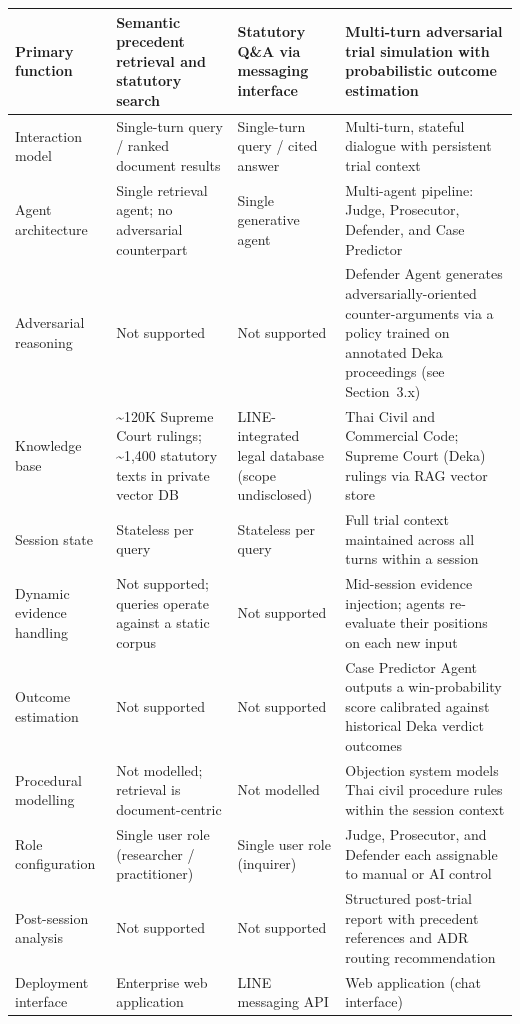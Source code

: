 \begin{longtable}{|p{3.2cm}|p{3.8cm}|p{3.8cm}|p{4.2cm}|}
Primary function & Semantic precedent retrieval and statutory search & Statutory Q\&A via messaging interface & Multi-turn adversarial trial simulation with probabilistic outcome estimation \\ \hline
Interaction model & Single-turn query / ranked document results & Single-turn query / cited answer & Multi-turn, stateful dialogue with persistent trial context \\ \hline
Agent architecture & Single retrieval agent; no adversarial counterpart & Single generative agent & Multi-agent pipeline: Judge, Prosecutor, Defender, and Case Predictor \\ \hline
Adversarial reasoning & Not supported & Not supported & Defender Agent generates adversarially-oriented counter-arguments via a policy trained on annotated Deka proceedings (see Section~3.x) \\ \hline
Knowledge base & \textasciitilde{}120K Supreme Court rulings; \textasciitilde{}1,400 statutory texts in private vector DB & LINE-integrated legal database (scope undisclosed) & Thai Civil and Commercial Code; Supreme Court (Deka) rulings via RAG vector store \\ \hline
Session state & Stateless per query & Stateless per query & Full trial context maintained across all turns within a session \\ \hline
Dynamic evidence handling & Not supported; queries operate against a static corpus & Not supported & Mid-session evidence injection; agents re-evaluate their positions on each new input \\ \hline
Outcome estimation & Not supported & Not supported & Case Predictor Agent outputs a win-probability score calibrated against historical Deka verdict outcomes \\ \hline
Procedural modelling & Not modelled; retrieval is document-centric & Not modelled & Objection system models Thai civil procedure rules within the session context \\ \hline
Role configuration & Single user role (researcher / practitioner) & Single user role (inquirer) & Judge, Prosecutor, and Defender each assignable to manual or AI control \\ \hline
Post-session analysis & Not supported & Not supported & Structured post-trial report with precedent references and ADR routing recommendation \\ \hline
Deployment interface & Enterprise web application & LINE messaging API & Web application (chat interface) \\ \hline
\end{longtable}

